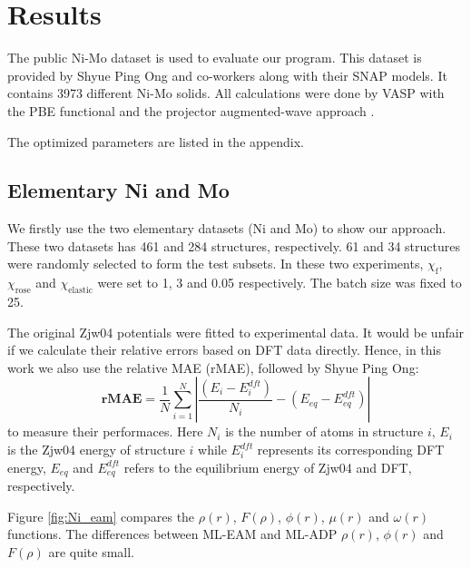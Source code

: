 \documentclass[final,3p,times]{elsarticle}
\begin{document}
% 
%
\section{Results}
\label{sec:results}

The public Ni-Mo dataset \cite{SNAP} is used to evaluate our program. This 
dataset is provided by Shyue Ping Ong and co-workers along with their SNAP 
models. It contains 3973 different Ni-Mo solids. All calculations were done by 
VASP \cite{VASP} with the PBE \cite{PBE} functional and the projector 
augmented-wave approach \cite{PAW}. 

The optimized parameters are listed in the appendix.

% 
%
\subsection{Elementary Ni and Mo}
\label{sec:elementary}

We firstly use the two elementary datasets (Ni and Mo) to show our approach. These 
two datasets has 461 and 284 structures, respectively. 61 and 34 structures were 
randomly selected to form the test subsets. In these two experiments, 
$\chi_{\mathrm{f}}$, $\chi_{\mathrm{rose}}$ and $\chi_{\mathrm{elastic}}$ were 
set to 1, 3 and 0.05 respectively. The batch size was fixed to 25.

The original Zjw04 potentials were fitted to experimental data. It would be 
unfair if we calculate their relative errors based on DFT data directly. Hence, 
in this work we also use the relative MAE (rMAE), 
followed by Shyue Ping Ong\cite{SNAP,SNAP_Mo}:
\begin{equation}
\mathbf{rMAE} = \frac{1}{N}\sum_{i=1}^{N}{
    | \frac{(E_i - E_i^{dft})}{N_i} - (E_{eq} - E_{eq}^{dft}) |
}
\end{equation}
to measure their performaces. Here $N_i$ is the number of atoms in structure 
$i$, $E_i$ is the Zjw04 energy of structure $i$ while $E_i^{dft}$ represents its 
corresponding DFT energy, $E_{eq}$ and $E_{eq}^{dft}$ refers to the equilibrium 
energy of Zjw04 and DFT, respectively.

Figure \ref{fig:Ni_eam} compares the $\rho(r)$, $F(\rho)$, $\phi(r)$, 
$\mu(r)$ and $\omega(r)$ functions. The differences between ML-EAM and ML-ADP 
$\rho(r)$, $\phi(r)$ and $F(\rho)$ are quite small. 
\end{document}
